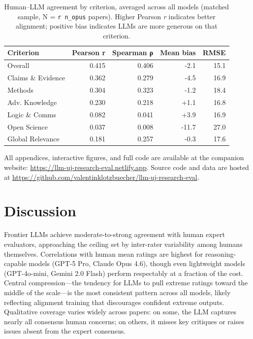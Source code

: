 \documentclass[
  11pt,
  letterpaper,
]{article}
\begin{document}
\begin{longtable}[]{@{}lrrrr@{}}

\caption{\label{tbl-criteria-agreement-main}Human--LLM agreement by
criterion, averaged across all models (matched sample, N =
\texttt{r\ n\_opus} papers). Higher Pearson \emph{r} indicates better
alignment; positive bias indicates LLMs are more generous on that
criterion.}

\tabularnewline

\toprule\noalign{}
Criterion & Pearson r & Spearman ρ & Mean bias & RMSE \\
\midrule\noalign{}
\endhead
\bottomrule\noalign{}
\endlastfoot
Overall & 0.415 & 0.406 & -2.1 & 15.1 \\
Claims \& Evidence & 0.362 & 0.279 & -4.5 & 16.9 \\
Methods & 0.304 & 0.323 & -1.2 & 18.4 \\
Adv. Knowledge & 0.230 & 0.218 & +1.1 & 16.8 \\
Logic \& Comms & 0.082 & 0.041 & +3.9 & 16.9 \\
Open Science & 0.037 & 0.008 & -11.7 & 27.0 \\
Global Relevance & 0.181 & 0.257 & -0.3 & 17.6 \\

\end{longtable}

All appendices, interactive figures, and full code are available at the
companion website: \url{https://llm-uj-research-eval.netlify.app}.
Source code and data are hosted at
\url{https://github.com/valentinklotzbuecher/llm-uj-research-eval}.


\section{Discussion}\label{discussion}

Frontier LLMs achieve moderate-to-strong agreement with human expert
evaluators, approaching the ceiling set by inter-rater variability among
humans themselves. Correlations with human mean ratings are highest for
reasoning-capable models (GPT-5 Pro, Claude Opus 4.6), though even
lightweight models (GPT-4o-mini, Gemini 2.0 Flash) perform respectably
at a fraction of the cost. Central compression---the tendency for LLMs
to pull extreme ratings toward the middle of the scale---is the most
consistent pattern across all models, likely reflecting alignment
training that discourages confident extreme outputs. Qualitative
coverage varies widely across papers: on some, the LLM captures nearly
all consensus human concerns; on others, it misses key critiques or
raises issues absent from the expert consensus.
\end{document}
